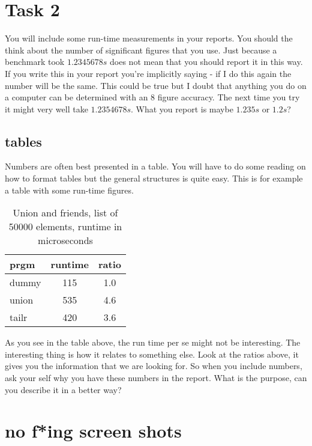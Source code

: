 \documentclass[a4paper,11pt]{article}
\begin{document}
\section*{Task 2}

You will include some run-time measurements in your reports. You
should the think about the number of significant figures that you
use. Just because a benchmark took $1.2345678 s$ does not mean that
you should report it in this way. If you write this in your report
you're implicitly saying - if I do this again the number will be the
same. This could be true but I doubt that anything you do on a
computer can be determined with an 8 figure accuracy. The next time
you try it might very well take $1.2354678 s$. What you report is
maybe $1.235 s$ or $1.2 s$?

\subsection*{tables}

Numbers are often best presented in a table. You will have to do some
reading on how to format tables but the general structures is quite
easy. This is for example a table with some run-time figures.

\begin{table}[h]
  \begin{center}
    \begin{tabular}{l|c|c}
      \textbf{prgm} & \textbf{runtime} & \textbf{ratio} \\
      \hline
      dummy         & 115              & 1.0            \\
      union         & 535              & 4.6            \\
      tailr         & 420              & 3.6            \\
    \end{tabular}
    \caption{Union and friends, list of 50000 elements, runtime in microseconds}
    \label{tab:table1}
  \end{center}
\end{table}

As you see in the table above, the run time per se might not be
interesting. The interesting thing is how it relates to something
else. Look at the ratios above, it gives you the information that we
are looking for. So when you include numbers, ask your self why you
have these numbers in the report. What is the purpose, can you
describe it in a better way?


\section*{no f*ing screen shots}
\end{document}
